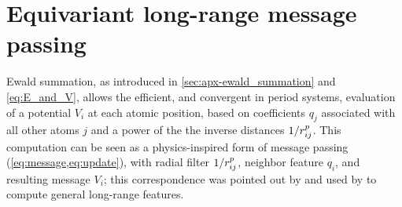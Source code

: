 \documentclass[10pt]{article} %
\begin{document}
\section{Equivariant long-range message passing}
\label{sec:lrmp}




Ewald summation, as introduced in \cref{sec:apx-ewald_summation} and \cref{eq:E_and_V}, allows the efficient, and convergent in period systems, evaluation of a potential $V_i$ at each atomic position, based on coefficients $q_j$ associated with all other atoms $j$ and a power of the the inverse distances $1/r_{ij}^p$.
This computation can be seen as a physics-inspired form of message passing (\cref{eq:message,eq:update}), with radial filter $1/r_{ij}^p$, neighbor feature $q_i$, and resulting message $V_i$; this correspondence was pointed out by \citet{kggg2023} and used by \citet{gc2019} to compute general long-range features.
\end{document}
